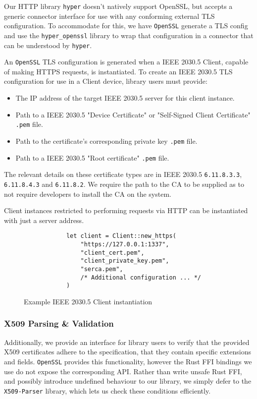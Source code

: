 Our HTTP library \texttt{hyper} doesn't natively support OpenSSL, but accepts a generic connector interface for use with any conforming external TLS configuration. To accommodate for this, we have \texttt{OpenSSL} generate a TLS config and use the \texttt{hyper\_openssl} library to wrap that configuration in a connector that can be understood by \texttt{hyper}. \cite{hyperopenssl}

An \texttt{OpenSSL} TLS configuration is generated when a IEEE 2030.5 Client, capable of making HTTPS requests, is instantiated. To create an IEEE 2030.5 TLS configuration for use in a Client device, library users must provide:

\begin{itemize}
    \item The IP address of the target IEEE 2030.5 server for this client instance.
    \item Path to a IEEE 2030.5 "Device Certificate" or "Self-Signed Client Certificate" \texttt{.pem} file.
    \item Path to the certificate's corresponding private key \texttt{.pem} file.
    \item Path to a IEEE 2030.5 "Root certificate" \texttt{.pem} file. 
\end{itemize}

The relevant details on these certificate types are in IEEE 2030.5 \texttt{6.11.8.3.3}, \texttt{6.11.8.4.3} and \texttt{6.11.8.2}. We require the path to the CA to be supplied as to not require developers to install the CA on the system.

Client instances restricted to performing requests via HTTP can be instantiated with just a server address.

\begin{figure}[h]
    \begin{center}
        \begin{lstlisting}
            let client = Client::new_https(
                "https://127.0.0.1:1337",
                "client_cert.pem",
                "client_private_key.pem",
                "serca.pem",
                /* Additional configuration ... */
            )
        \end{lstlisting}
        \label{fig:httpsclientexample}
        \vspace{-10pt}
        \caption{Example IEEE 2030.5 Client instantiation}
    \end{center}
\end{figure}

\subsubsection{X509 Parsing \& Validation}
Additionally, we provide an interface for library users to verify that the provided X509 certificates adhere to the specification, that they contain specific extensions and fields. \texttt{OpenSSL} provides this functionality, however the Rust FFI bindings we use do not expose the corresponding API. Rather than write unsafe Rust FFI, and possibly introduce undefined behaviour to our library, we simply defer to the \texttt{X509-Parser} library, which lets us check these conditions efficiently. \cite{x509parser}

